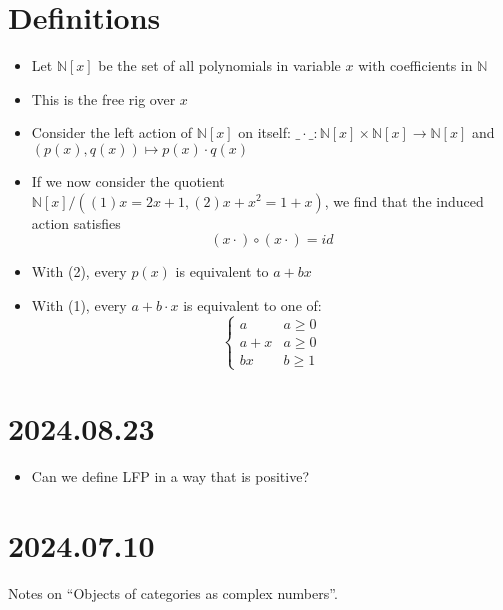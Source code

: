 \documentclass[letterpaper,numbers=enddot]{scrartcl}
\newcommand{\nat}{\mathbb{N}}
\begin{document}
\section{Definitions}

\begin{itemize}
  \item Let $\nat[x]$ be the set of all polynomials in variable $x$ with coefficients in $\nat$
  \item This is the free rig over ${x}$
  \item Consider the left action of $\nat[x]$ on itself: $\_\cdot\_ : \nat[x] \times \nat[x] \to \nat[x]$ and $(p(x) , q(x)) \mapsto p(x) \cdot q(x)$
  \item If we now consider the quotient $\nat[x] / ((1) x=2x+1 , (2) x+x^2=1+x)$, we find that the induced action satisfies \[(x\cdot) \circ (x\cdot) = id\]
  \item With (2), every $p(x)$ is equivalent to $a+bx$
  \item With (1), every $a+b\cdot x$ is equivalent to one of: \[\begin{cases}
    a & a \ge 0 \\
    a + x & a                                                                                                                                                                                                                                                                                                                                                                                                                                                                                                     \ge 0 \\
    bx & b \ge 1
  \end{cases}\]
\end{itemize}

\section{2024.08.23}

\begin{itemize}
  \item Can we define LFP in a way that is positive?
\end{itemize}

\section{2024.07.10}

Notes on ``Objects of categories as complex numbers''.
\end{document}

